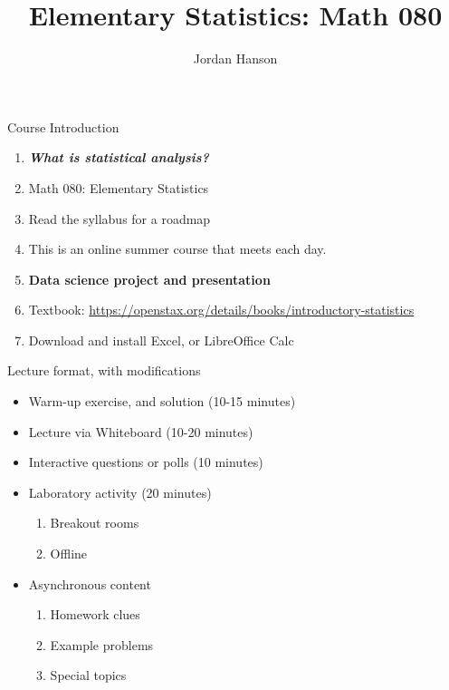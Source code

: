 \documentclass{beamer}
\title{Elementary Statistics: Math 080}
\author{Jordan Hanson}
\institute{Whittier College Department of Physics and Astronomy}
\begin{document}
\maketitle

\begin{frame}{Course Introduction}
\begin{enumerate}
\item \textit{\textbf{\alert{What is statistical analysis?}}}
\item Math 080: Elementary Statistics
\item Read the syllabus for a roadmap
\item This is an online summer course that meets each day.
\item \textbf{Data science project and presentation}
\item Textbook: \url{https://openstax.org/details/books/introductory-statistics}
\item Download and install Excel, or LibreOffice Calc
\end{enumerate}
\end{frame}

\begin{frame}{Lecture format, with modifications}
\begin{itemize}
\item Warm-up exercise, and solution (10-15 minutes)
\item Lecture via Whiteboard (10-20 minutes)
\item Interactive questions or polls (10 minutes)
\item Laboratory activity (20 minutes)
\begin{enumerate}
\item Breakout rooms
\item Offline
\end{enumerate}
\item Asynchronous content
\begin{enumerate}
\item Homework clues
\item Example problems
\item Special topics
\end{enumerate}
\end{itemize}
\end{frame}
\end{document}
